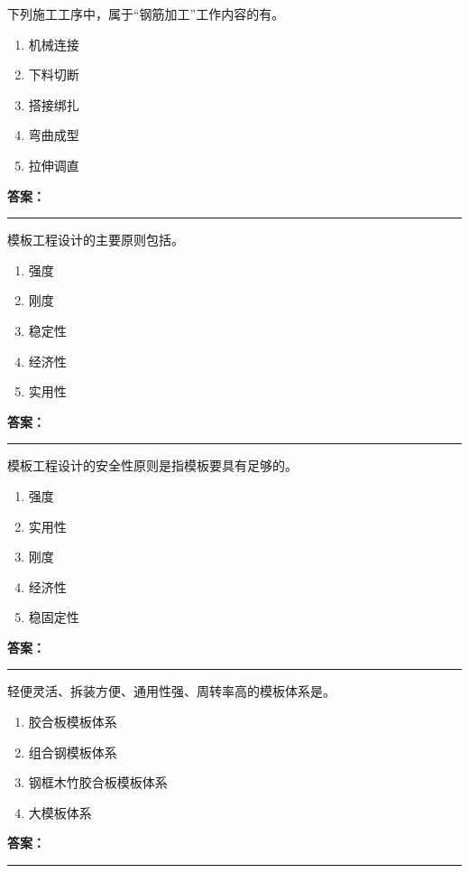 \documentclass[UTF8,fontset=fandol,11pt]{ctexart}
\newcommand{\answerline}{\textcolor{answerred}{\rule{2.4cm}{0.7pt}}}
\begin{document}
\begin{quizbox}[title={第 21 题}]
下列施工工序中，属于“钢筋加工”工作内容的有。\\
\begin{enumerate}[label=\Alph*.]
\item 机械连接
\item 下料切断
\item 搭接绑扎
\item 弯曲成型
\item 拉伸调直
\end{enumerate}
\textbf{\textcolor{answerred}{答案：}} \answerline
\end{quizbox}

\begin{quizbox}[title={第 22 题}]
模板工程设计的主要原则包括。\\
\begin{enumerate}[label=\Alph*.]
\item 强度
\item 刚度
\item 稳定性
\item 经济性
\item 实用性
\end{enumerate}
\textbf{\textcolor{answerred}{答案：}} \answerline
\end{quizbox}

\begin{quizbox}[title={第 23 题}]
模板工程设计的安全性原则是指模板要具有足够的。\\
\begin{enumerate}[label=\Alph*.]
\item 强度
\item 实用性
\item 刚度
\item 经济性
\item 稳固定性
\end{enumerate}
\textbf{\textcolor{answerred}{答案：}} \answerline
\end{quizbox}

\begin{quizbox}[title={第 24 题}]
轻便灵活、拆装方便、通用性强、周转率高的模板体系是。\\
\begin{enumerate}[label=\Alph*.]
\item 胶合板模板体系
\item 组合钢模板体系
\item 钢框木竹胶合板模板体系
\item 大模板体系
\end{enumerate}
\textbf{\textcolor{answerred}{答案：}} \answerline
\end{quizbox}
\end{document}
